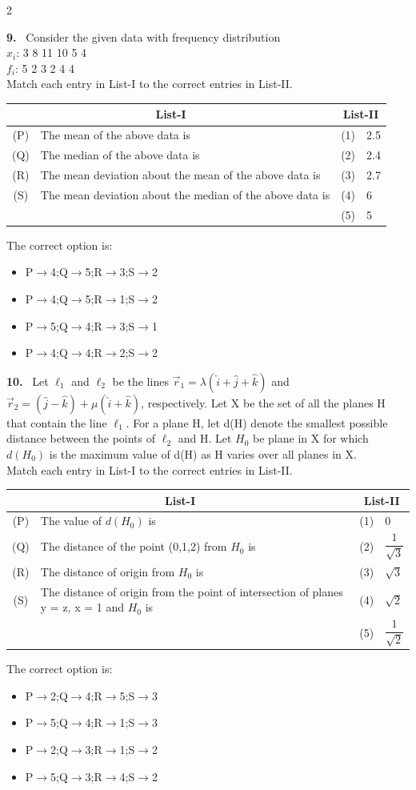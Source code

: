\documentclass[10pt]{extarticle}
\newcommand{\qn}[1]{\par\smallskip\noindent\textbf{#1.}~}
\newenvironment{qoptions}{\begin{itemize}[leftmargin=1.8em,itemsep=1pt,topsep=2pt,label={}]}{\end{itemize}}
\newcommand{\opt}[2]{\item[(#1)] #2}
\begin{document}
\begin{multicols}{2}
\qn{9} Consider the given data with frequency distribution\\
$x_i$: 3 8 11 10 5 4\\
$f_i$: 5 2 3 2 4 4\\
Match each entry in List-I to the correct entries in List-II.
\begin{center}
\begin{tabular}{|c|p{4.3cm}|c|l|}
\hline
\multicolumn{2}{|c|}{List-I} & \multicolumn{2}{c|}{List-II} \\
\hline
(P) & The mean of the above data is & (1) & 2.5 \\
\hline
(Q) & The median of the above data is & (2) & 2.4 \\
\hline
(R) & The mean deviation about the mean of the above data is & (3) & 2.7 \\
\hline
(S) & The mean deviation about the median of the above data is & (4) & 6 \\
\hline
 & & (5) & 5 \\
\hline
\end{tabular}
\end{center}
The correct option is:
\begin{qoptions}
\opt{A}{P$\to$4;Q$\to$5;R$\to$3;S$\to$2}
\opt{B}{P$\to$4;Q$\to$5;R$\to$1;S$\to$2}
\opt{C}{P$\to$5;Q$\to$4;R$\to$3;S$\to$1}
\opt{D}{P$\to$4;Q$\to$4;R$\to$2;S$\to$2}
\end{qoptions}

\qn{10} Let $\ell_1$ and $\ell_2$ be the lines $\vec r_1=\lambda(\hat i+\hat j+\hat k)$ and $\vec r_2=(\hat j-\hat k)+\mu(\hat i+\hat k)$, respectively. Let X be the set of all the planes H that contain the line $\ell_1$. For a plane H, let d(H) denote the smallest possible distance between the points of $\ell_2$ and H. Let $H_0$ be plane in X for which $d(H_0)$ is the maximum value of d(H) as H varies over all planes in X.\\
Match each entry in List-I to the correct entries in List-II.
\begin{center}
\begin{tabular}{|c|p{4.3cm}|c|l|}
\hline
\multicolumn{2}{|c|}{List-I} & \multicolumn{2}{c|}{List-II} \\
\hline
(P) & The value of $d(H_0)$ is & (1) & 0 \\
\hline
(Q) & The distance of the point (0,1,2) from $H_0$ is & (2) & $\dfrac{1}{\sqrt3}$ \\
\hline
(R) & The distance of origin from $H_0$ is & (3) & $\sqrt3$ \\
\hline
(S) & The distance of origin from the point of intersection of planes y = z, x = 1 and $H_0$ is & (4) & $\sqrt2$ \\
\hline
 & & (5) & $\dfrac{1}{\sqrt2}$ \\
\hline
\end{tabular}
\end{center}
The correct option is:
\begin{qoptions}
\opt{A}{P$\to$2;Q$\to$4;R$\to$5;S$\to$3}
\opt{B}{P$\to$5;Q$\to$4;R$\to$1;S$\to$3}
\opt{C}{P$\to$2;Q$\to$3;R$\to$1;S$\to$2}
\opt{D}{P$\to$5;Q$\to$3;R$\to$4;S$\to$2}
\end{qoptions}


\end{multicols}
\end{document}

